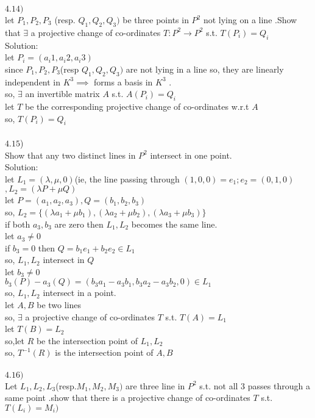 \documentclass[11pt]{article}
\begin{document}
$4.14)$\\
let $P_1,P_2,P_3$ (resp. $Q_1,Q_2,Q_3)$ be three points in $P^2$ not lying on a line .Show that $\exists$ a projective change of co-ordinates $T:P^2\to P^2$ s.t. $T(P_i)=Q_i$\\
Solution:\\
let $P_i=(a_i1,a_i2,a_i3)$ \\
since $P_1,P_2,P_3$(resp $Q_1,Q_2,Q_3)$ are not lying in a line so, they are linearly independent in $K^3\implies $ forms a basis in $K^3$ .\\
so, $\exists$ an invertible matrix $A$ s.t. $A(P_i)=Q_i$\\
let $T$ be the corresponding projective change of co-ordinates w.r.t $A$\\
so, $T(P_i)=Q_i$\\\\
$4.15$)\\
Show that any two distinct lines in $P^2$ intersect in one point.\\
Solution:\\
let $L_1=(\lambda,\mu,0)$(ie, the line passing through $(1,0,0)=e_1;e_2=(0,1,0)$ $,L_2=(\lambda P+\mu Q)$\\
let $P=(a_1,a_2,a_3),Q=(b_1,b_2,b_3)$\\
so, $L_2=\{(\lambda a_1+\mu b_1),(\lambda a_2+\mu b_2),(\lambda a_3+\mu b_3)\}$\\
if both $a_3,b_3$ are zero then $L_1,L_2$ becomes the same line.\\
let $a_3\neq 0$\\
if $b_3=0$ then $Q=b_1 e_1+b_2 e_2\in L_1$\\
so, $L_1,L_2$ intersect in $Q$\\
let $b_3\neq 0$\\
$b_3(P)-a_3(Q)=(b_3a_1-a_3b_1,b_3a_2-a_3b_2,0)\in L_1$\\
so, $L_1,L_2$ intersect in a point.\\
let $A,B$ be two lines \\
so, $\exists$ a projective change of co-ordinates $T$ s.t. $T(A)=L_1$\\
let $T(B)=L_2$\\
so,let $R$ be the intersection point of $L_1,L_2$\\
so, $T^{-1}(R)$ is the intersection point of $A,B$\\\\
$4.16)$\\
Let $L_1,L_2,L_3$(resp.$M_1,M_2,M_3)$ are three line in $P^2$ s.t. not all $3$ passes through a same point .show that there is a projective change of co-ordinates $T$ s.t. $T(L_i)=M_i)$\\
\end{document}
